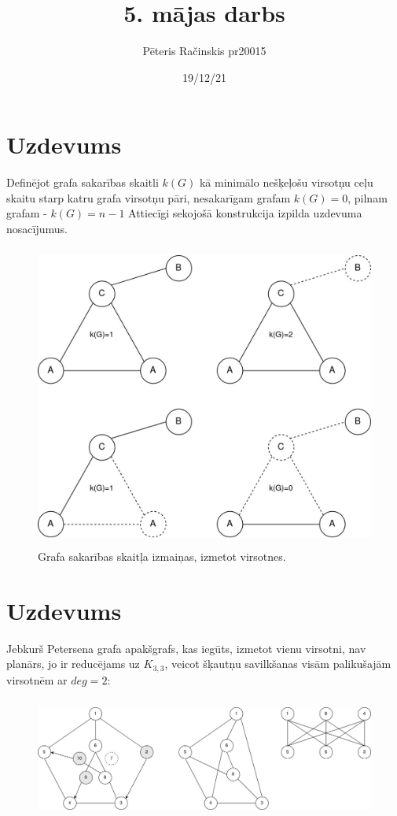 \documentclass[12pt, a4paper]{article}
\author{Pēteris Račinskis pr20015}
\date{19/12/21}
\begin{document}
\title{5. mājas darbs}

\maketitle

\section{Uzdevums}

Definējot grafa sakarības skaitli $k(G)$ kā minimālo nešķeļošu virsotņu ceļu skaitu starp katru grafa virsotņu pāri, nesakarīgam grafam $k(G)=0$, pilnam grafam - $k(G)=n-1$
Attiecīgi sekojošā konstrukcija izpilda uzdevuma nosacījumus.

\begin{figure}[h!]
    \centering
    \includegraphics[height=10cm,page=1]{task-1.jpeg}
    \caption{Grafa sakarības skaitļa izmaiņas, izmetot virsotnes.}
\end{figure}

\newpage
\section{Uzdevums}

Jebkurš Petersena grafa apakšgrafs, kas iegūts, izmetot vienu virsotni, nav planārs, jo ir reducējams uz $K_{3,3}$, veicot šķautņu savilkšanas visām palikušajām virsotnēm ar $deg=2$:

\begin{figure}[h!]
    \centering
    \includegraphics[height=4cm,page=1]{task2-1.jpeg}
\end{figure}
\end{document}

